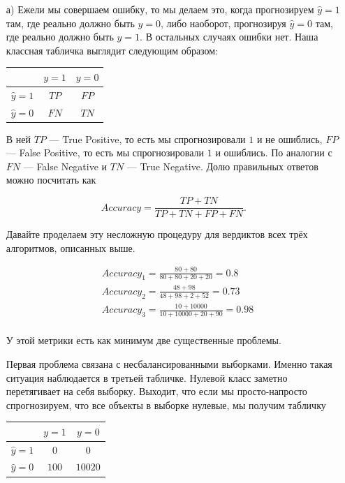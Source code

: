 \documentclass[12pt, a4paper, oneside]{article}
\theoremstyle{plain} %
\theoremstyle{definition}
\begin{document}
\begin{solution}
	\begin{enumerate}
		\item[а)] 	Ежели мы совершаем ошибку, то мы делаем это, когда прогнозируем $\hat y = 1$ там, где реально должно быть $y = 0$, либо наоборот, прогнозируя $\hat y = 0$ там, где реально должно быть $y=1$.  В остальных случаях ошибки нет.  Наша классная табличка выглядит следующим образом: 
		
		\begin{center}
			\begin{tabular}{|c|c|c|}
				\hline
				& $y=1$  &  $ y = 0$ \\  \hline 
				$\hat y = 1$  &    $TP$ &     $FP$ \\      \hline 
				$\hat y = 0$ &    $FN$ &     $TN$ \\      \hline 
			\end{tabular}
		\end{center}
		
		В ней $TP$ --- True Positive, то есть мы спрогнозировали $1$ и не ошиблись, $FP$ --- False Positive, то есть мы спрогнозировали $1$ и ошиблись. По аналогии с $FN$ --- False Negative и  $TN$ --- True Negative. Долю правильных ответов можно посчитать как 
		
		\[
		Accuracy = \frac{TP + TN}{TP + TN + FP + FN}.
		\]
		
		Давайте проделаем эту несложную процедуру для вердиктов всех трёх алгоритмов, описанных выше. 
		
		\begin{equation} 
		\begin{aligned}
		&Accuracy_1 = \frac{80 + 80}{80 + 80 + 20 + 20} = 0.8   \\ 
		&Accuracy_2 = \frac{48 + 98}{48 + 98 + 2 + 52} = 0.73  \\ 
		&Accuracy_3 = \frac{10 + 10000}{10 + 10000 + 20 + 90} = 0.98  \\ 
		\end{aligned}
		\end{equation} 
		
		У этой метрики есть как минимум две существенные проблемы. 
		
		Первая проблема связана с несбалансированными выборками. Именно такая ситуация наблюдается в третьей табличке. Нулевой класс заметно перетягивает на себя выборку. Выходит, что если мы просто-напросто спрогнозируем, что все объекты в выборке нулевые, мы получим табличку 
		
		\begin{center}
			\begin{tabular}{|c|c|c|}
				\hline
				& $y=1$  &  $ y = 0$ \\  \hline 
				$\hat y = 1$  &   $0$ &    $0$ \\         \hline 
				$\hat y = 0$ &   $100$ &    $10020$ \\   \hline 
			\end{tabular}
		\end{center}
		

\end{enumerate}
\end{solution}
\end{document}
